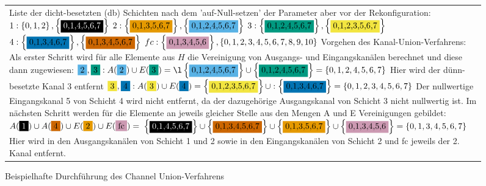 \begin{figure}
\begin{minipage}[c]{1\linewidth}
\begin{tabularx}{1\textwidth}{m{0.2\textwidth}m{0.8\textwidth}}
\\
\multicolumn{2}{m{1\linewidth}}{Liste der dicht-besetzten (db) Schichten nach dem 'auf-Null-setzen' der Parameter aber vor der Rekonfiguration:\newline
$1:\left\{0,1,2\right\},\left\{\colorbox{black}{\textcolor{white}{0,1,4,5,6,7}}\right\}$\newline
$2:\left\{\colorbox{orange}{0,1,3,5,6,7}\right\},\left\{\colorbox{sky}{0,1,2,4,5,6,7}\right\}$\newline
$3:\left\{\colorbox{bluegreen}{0,1,2,4,5,6,7}\right\},\left\{\colorbox{yellow}{0,1,2,3,5,6,7}\right\}$\newline
$4:\left\{\colorbox{blue2}{0,1,3,4,6,7}\right\},\left\{\colorbox{vermi}{0,1,3,4,5,6,7}\right\}$\newline
$fc:\left\{\colorbox{purple}{0,1,3,4,5,6}\right\},\left\{0,1,2,3,4,5,6,7,8,9,10\right\}$\newline
Vorgehen des Kanal-Union-Verfahrens:
Als erster Schritt wird für alle Elemente aus $H$ die Vereinigung von Ausgangs- und Eingangskanälen berechnet und diese dann zugewiesen:\newline
$\colorbox{sky}{2},\colorbox{bluegreen}{3}:A(\colorbox{sky}{2}) \cup E(\colorbox{bluegreen}{3})= \l\left\{\colorbox{sky}{0,1,2,4,5,6,7}\right\} \cup \left\{\colorbox{bluegreen}{0,1,2,4,5,6,7}\right\} =\left\{0,1,2,4,5,6,7\right\} $\newline
Hier wird der dünn-besetzte Kanal 3 entfernt \newline
$\colorbox{yellow}{3},\colorbox{blue2}{4}: A(\colorbox{yellow}{3}) \cup E(\colorbox{blue2}{4}) =
\left\{\colorbox{yellow}{0,1,2,3,5,6,7}\right\} \cup :\left\{\colorbox{blue2}{0,1,3,4,6,7}\right\} =\left\{0,1,2,3,4,5,6,7\right\}$\newline
Der nullwertige Eingangskanal 5 von Schicht 4 wird nicht entfernt, da der dazugehörige Ausgangskanal von Schicht 3 nicht nullwertig ist.
Im nächsten Schritt werden für die Elemente an jeweils gleicher Stelle aus den Mengen A und E Vereinigungen gebildet:
$A(\colorbox{black}{\textcolor{white}{1}})\cup A(\colorbox{vermi}{4}) \cup E(\colorbox{orange}{2}) \cup E(\colorbox{purple}{fc})=$\newline
$\left\{\colorbox{black}{\textcolor{white}{0,1,4,5,6,7}}\right\} \cup \left\{\colorbox{vermi}{0,1,3,4,5,6,7}\right\} \cup \left\{\colorbox{orange}{0,1,3,5,6,7}\right\} \cup \left\{\colorbox{purple}{0,1,3,4,5,6}\right\} = \left\{ 0,1,3,4,5,6,7\right\}$\newline
Hier wird in den Ausgangskanälen von Schicht 1 und 2 sowie in den Eingangskanälen von Schicht 2 und fc jeweils der 2. Kanal entfernt.}
\end{tabularx}
\end{minipage}
\caption{Beispielhafte Durchführung des Channel Union-Verfahrens}
\label{abb:channelUnion}
\end{figure}



